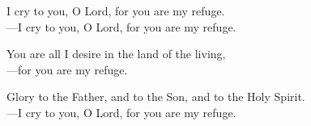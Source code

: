 \responsory

\noindent I cry to you, O Lord, for you are my refuge.\\
{\color{red}---\thinspace}I cry to you, O Lord, for you are my refuge.

\medskip\noindent You are all I desire in the land of the living,\\
{\color{red}---\thinspace}for you are my refuge.

\medskip\noindent Glory to the Father, and to the Son, and to the Holy Spirit.\\
{\color{red}---\thinspace}I cry to you, O Lord, for you are my refuge.